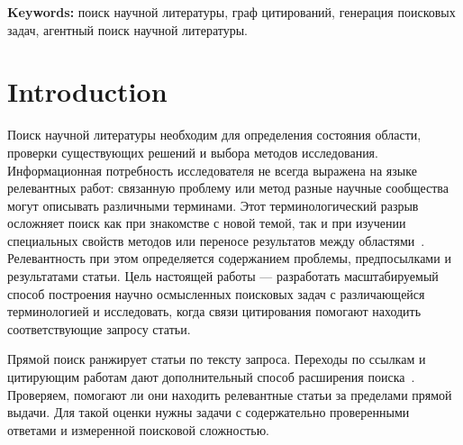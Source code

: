 \maketitle

\begin{abstract}
    Различия в терминологии могут затруднять поиск научных статей. Мы разработали фабрику, которая выделяет группы статей с общим научным аспектом в графе цитирований, формулирует по ним поисковые вопросы и проверяет кандидатные ответы по полным текстам. В трёх сериях получена 51 завершённая запись с 45 различными текстами вопросов. Для 33 вопросов построены описательные версии; у 26 сохранились все прежние цели. Сравнение на этих вопросах не подтвердило ожидаемого усложнения прямого поиска. Полученные вопросы и результаты проверок позволяют изучать отдельно качество формулировки, состав ответов и поисковую сложность. Преимущество обхода цитирований требует дальнейшего сравнения с поисковыми агентами.
\end{abstract}

\textbf{Keywords:} поиск научной литературы, граф цитирований, генерация поисковых задач, агентный поиск научной литературы.

\section{Introduction}\label{sec:intro}

Поиск научной литературы необходим для определения состояния области, проверки существующих решений и выбора методов исследования. Информационная потребность исследователя не всегда выражена на языке релевантных работ: связанную проблему или метод разные научные сообщества могут описывать различными терминами. Этот терминологический разрыв осложняет поиск как при знакомстве с новой темой, так и при изучении специальных свойств методов или переносе результатов между областями~\cite{furnas1987vocabulary,kulikowski2026sameproblem}. Релевантность при этом определяется содержанием проблемы, предпосылками и результатами статьи. Цель настоящей работы --- разработать масштабируемый способ построения научно осмысленных поисковых задач с различающейся терминологией и исследовать, когда связи цитирования помогают находить соответствующие запросу статьи.

Прямой поиск ранжирует статьи по тексту запроса. Переходы по ссылкам и цитирующим работам дают дополнительный способ расширения поиска~\cite{wohlin2014snowballing}. Проверяем, помогают ли они находить релевантные статьи за пределами прямой выдачи. Для такой оценки нужны задачи с содержательно проверенными ответами и измеренной поисковой сложностью.

